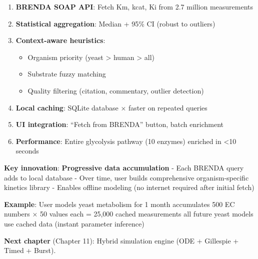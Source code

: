 \begin{enumerate}
\def\labelenumi{\arabic{enumi}.}
\tightlist
\item
  \textbf{BRENDA SOAP API}: Fetch Km, kcat, Ki from 2.7 million
  measurements
\item
  \textbf{Statistical aggregation}: Median + 95\% CI (robust to
  outliers)
\item
  \textbf{Context-aware heuristics}:

  \begin{itemize}
  \tightlist
  \item
    Organism priority (yeast \textgreater{} human \textgreater{} all)
  \item
    Substrate fuzzy matching
  \item
    Quality filtering (citation, commentary, outlier detection)
  \end{itemize}
\item
  \textbf{Local caching}: SQLite database × faster on repeated
  queries
\item
  \textbf{UI integration}: ``Fetch from BRENDA'' button, batch
  enrichment
\item
  \textbf{Performance}: Entire glycolysis pathway (10 enzymes) enriched
  in \textless10 seconds
\end{enumerate}

\textbf{Key innovation}: \textbf{Progressive data accumulation} - Each
BRENDA query adds to local database - Over time, user builds
comprehensive organism-specific kinetics library - Enables offline
modeling (no internet required after initial fetch)

\textbf{Example}: User models yeast metabolism for 1 month \textrightarrow accumulates
500 EC numbers × 50 values each = 25,000 cached measurements \textrightarrow all
future yeast models use cached data (instant parameter inference)

\textbf{Next chapter} (Chapter 11): Hybrid simulation engine (ODE +
Gillespie + Timed + Burst).
